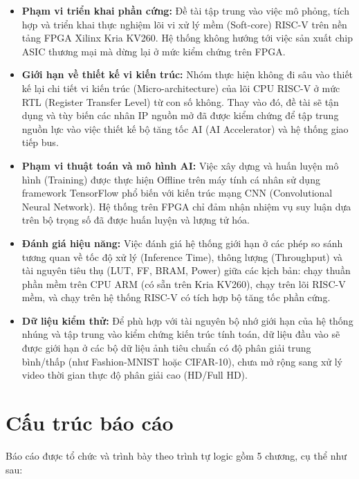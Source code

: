 \begin{itemize}
    \item \textbf{Phạm vi triển khai phần cứng:} Đề tài tập trung vào việc mô phỏng, tích hợp và triển khai thực nghiệm lõi vi xử lý mềm (Soft-core) RISC-V trên nền tảng FPGA Xilinx Kria KV260. Hệ thống không hướng tới việc sản xuất chip ASIC thương mại mà dừng lại ở mức kiểm chứng trên FPGA.

    \item \textbf{Giới hạn về thiết kế vi kiến trúc:} Nhóm thực hiện không đi sâu vào thiết kế lại chi tiết vi kiến trúc (Micro-architecture) của lõi CPU RISC-V ở mức RTL (Register Transfer Level) từ con số không. Thay vào đó, đề tài sẽ tận dụng và tùy biến các nhân IP nguồn mở đã được kiểm chứng để tập trung nguồn lực vào việc thiết kế bộ tăng tốc AI (AI Accelerator) và hệ thống giao tiếp bus.

    \item \textbf{Phạm vi thuật toán và mô hình AI:} Việc xây dựng và huấn luyện mô hình (Training) được thực hiện Offline trên máy tính cá nhân sử dụng framework TensorFlow phổ biến  với kiến trúc mạng CNN (Convolutional Neural Network). Hệ thống trên FPGA chỉ đảm nhận nhiệm vụ suy luận dựa trên bộ trọng số đã được huấn luyện và lượng tử hóa.

    \item \textbf{Đánh giá hiệu năng:} Việc đánh giá hệ thống giới hạn ở các phép so sánh tương quan về tốc độ xử lý (Inference Time), thông lượng (Throughput) và tài nguyên tiêu thụ (LUT, FF, BRAM, Power) giữa các kịch bản: chạy thuần phần mềm trên CPU ARM (có sẵn trên Kria KV260), chạy trên lõi RISC-V mềm, và chạy trên hệ thống RISC-V có tích hợp bộ tăng tốc phần cứng.

    \item \textbf{Dữ liệu kiểm thử:} Để phù hợp với tài nguyên bộ nhớ giới hạn của hệ thống nhúng và tập trung vào kiểm chứng kiến trúc tính toán, dữ liệu đầu vào sẽ được giới hạn ở các bộ dữ liệu ảnh tiêu chuẩn có độ phân giải trung bình/thấp (như Fashion-MNIST hoặc CIFAR-10), chưa mở rộng sang xử lý video thời gian thực độ phân giải cao (HD/Full HD).
\end{itemize}

\newpage
\section{Cấu trúc báo cáo}

Báo cáo được tổ chức và trình bày theo trình tự logic gồm 5 chương, cụ thể như sau:

